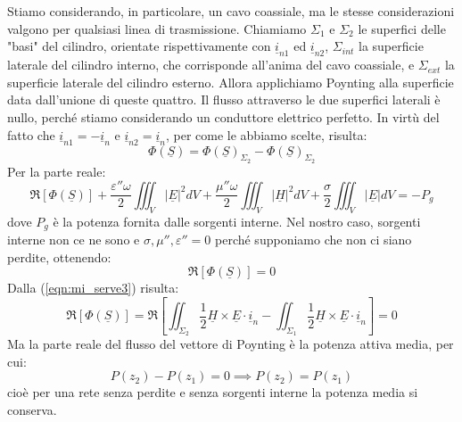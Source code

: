 \documentclass{book}
\begin{document}
        Stiamo considerando, in particolare, un cavo coassiale, ma le stesse considerazioni valgono
        per qualsiasi linea di trasmissione. Chiamiamo $\Sigma_{1}$ e $\Sigma_{2}$ le superfici delle "basi" del cilindro,
        orientate rispettivamente con $\underline{i}_{n1}$ ed $\underline{i}_{n2}$, $\Sigma_{int}$ la superficie laterale del cilindro interno,
        che corrisponde all'anima del cavo coassiale, e $\Sigma_{ext}$ la superficie laterale del cilindro esterno.
        Allora applichiamo Poynting alla superficie data dall'unione di queste quattro. Il flusso attraverso le due superfici laterali è nullo,
        perché stiamo considerando un conduttore elettrico perfetto. In virtù del fatto che $\underline{i}_{n1}=-\underline{i}_{n}$ e 
        $\underline{i}_{n2}=\underline{i}_{n}$, per come le abbiamo scelte, risulta:
        \begin{equation}
            \label{eqn:mi_serve3}
            \Phi(\underline{S}) = \Phi(\underline{S})_{\Sigma_{2}}-\Phi(\underline{S})_{\Sigma_{2}}
        \end{equation}
        Per la parte reale:
        \begin{equation}
            \Re[\Phi(\underline{S})]+\frac{\varepsilon '' \omega}{2}\iiint_{V} |\underline{E}|^{2}dV+\frac{\mu '' \omega}{2} \iiint_{V} |\underline{H}|^{2}dV
            +\frac{\sigma}{2}\iiint_{V}|\underline{E}|dV = - P_{g}
        \end{equation}
        dove $P_{g}$ è la potenza fornita dalle sorgenti interne. Nel nostro caso, sorgenti interne non ce ne sono e $\sigma, \mu'', \varepsilon'' = 0$ perché
        supponiamo che non ci siano perdite, ottenendo:
        \begin{equation}
            \Re[\Phi(\underline{S})]=0
        \end{equation}
        Dalla (\ref{eqn:mi_serve3}) risulta:
        \begin{equation}
            \Re[\Phi(\underline{S})] = \Re[\iint_{\Sigma_{2}} \frac{1}{2}\underline{H} \times \underline{E}\cdot \underline{i}_{n}
            -\iint_{\Sigma_{1}} \frac{1}{2}\underline{H} \times \underline{E}\cdot \underline{i}_{n}] = 0
        \end{equation}
        Ma la parte reale del flusso del vettore di Poynting è la potenza attiva media, per cui:
        \begin{equation}
            P(z_{2})-P(z_{1}) = 0 \implies P(z_{2})=P(z_{1})
        \end{equation}
        cioè per una rete senza perdite e senza sorgenti interne la potenza media si conserva.
\end{document}
